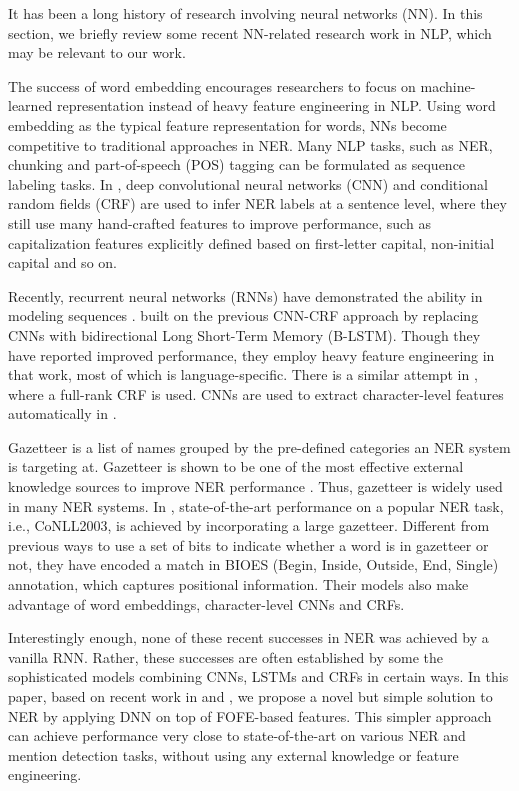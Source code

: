 \documentclass[11pt,a4paper]{article}
\begin{document}
It has been a long history of research involving neural networks (NN). In this section, we briefly review some recent NN-related research work in NLP, which may be relevant to our work. 

The success of word embedding \cite{mikolov2013distributed} encourages researchers to focus on machine-learned representation instead of heavy feature engineering in NLP. Using word embedding as the typical feature representation for words, NNs become competitive to traditional approaches in NER. 
Many NLP tasks, such as NER, chunking and part-of-speech (POS) tagging can be formulated as sequence labeling tasks.
In \cite{collobert2011natural}, 
deep convolutional neural networks (CNN) and conditional random fields (CRF) are used to infer NER labels at a sentence level, where they still  use many hand-crafted features to improve performance, such as capitalization features explicitly defined based on first-letter capital, non-initial capital and so on.

Recently, recurrent neural networks (RNNs) have demonstrated the ability in modeling sequences \cite{graves2012neural}. 
 built on the previous CNN-CRF approach by replacing CNNs with bidirectional Long Short-Term Memory (B-LSTM). 
Though they have reported improved performance, they employ heavy feature engineering in that work, most of which is language-specific. There is a similar attempt in \cite{rondeau2016lstm}, where a full-rank CRF is used. 
CNNs are used to extract character-level features automatically in \cite{dos2015boosting}. 

Gazetteer is a list of names grouped by the pre-defined categories an NER system is targeting at. 
Gazetteer is shown to be one of the most effective external knowledge sources to improve NER performance \cite{tjong2003introduction}. Thus,  gazetteer is widely used in many NER systems.  
In \cite{chiu2016named}, state-of-the-art performance on a popular NER task, i.e., CoNLL2003,  is achieved by incorporating  a large gazetteer. 
Different from previous ways to use a set of bits to indicate whether a word is in gazetteer or not, 
they have encoded a match in BIOES (Begin, Inside, Outside, End, Single) annotation, 
which captures positional information. Their models also make advantage of word embeddings, character-level CNNs and CRFs. 

Interestingly enough, none of these recent successes in NER was achieved by a vanilla RNN. Rather, 
these successes are often established by some the sophisticated models combining CNNs, LSTMs and CRFs in certain ways. 
In this paper, based on recent work in  \cite{zhang2015fixed} and \cite{zhang2016compact},
we propose a novel but simple solution to NER by applying DNN on top of FOFE-based features.
This simpler approach can achieve performance very close to state-of-the-art on various NER and mention detection tasks, without using any external knowledge or feature engineering.
\end{document}
